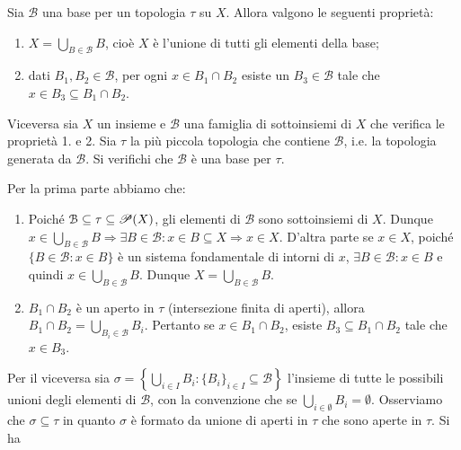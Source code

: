 \begin{es}
  Sia $ \mathcal{B} $ una base per un topologia $ \tau $ su $ X $. Allora valgono le seguenti proprietà:
  \begin{enumerate}
  \item $ X = \bigcup_{B \in \mathcal{B}} B $, cioè $ X $ è l'unione di tutti gli elementi della base;
  \item dati $ B_1, B_2 \in \mathcal{B} $, per ogni $ x \in B_1 \cap B_2 $ esiste un $ B_3 \in \mathcal{B} $ tale che $ x \in B_3 \subseteq B_1 \cap B_2 $.
  \end{enumerate}
  Viceversa sia $ X $ un insieme e $ \mathcal{B} $ una famiglia di sottoinsiemi di $ X $ che verifica le proprietà 1. e 2. Sia $ \tau $ la più piccola topologia che contiene $ \mathcal{B} $, i.e. la topologia generata da $ \mathcal{B} $. Si verifichi che $ \mathcal{B} $ è una base per $ \tau $.
\end{es}
%
Per la prima parte abbiamo che:
\begin{enumerate}
\item Poiché $ \mathcal{B} \subseteq \tau \subseteq \P(X) $, gli elementi di $ \mathcal{B} $ sono sottoinsiemi di $ X $. Dunque $ x \in \bigcup_{B \in \mathcal{B}} B \Rightarrow \exists B \in \mathcal{B} : x \in B \subseteq X \Rightarrow x \in X $. D'altra parte se $ x \in X $, poiché $ \{B \in \mathcal{B} : x \in B\} $ è un sistema fondamentale di intorni di $ x $, $ \exists B \in \mathcal{B} : x \in B $ e quindi $ x \in \bigcup_{B \in \mathcal{B}} B $. Dunque $ X = \bigcup_{B \in \mathcal{B}} B $.
\item $ B_1 \cap B_2 $ è un aperto in $ \tau $ (intersezione finita di aperti), allora $ B_1 \cap B_2 = \bigcup_{B_i \in \mathcal{B}} B_i $. Pertanto se $ x \in B_1 \cap B_2 $, esiste $ B_3 \subseteq B_1 \cap B_2 $ tale che $ x \in B_3 $.
\end{enumerate}
Per il viceversa sia $ \sigma = \left\{\bigcup_{i \in I} B_i : \{B_i\}_{i \in I} \subseteq \mathcal{B}\right\} $ l'insieme di tutte le possibili unioni degli elementi di $ \mathcal{B} $, con la convenzione che se $ \bigcup_{i \in \emptyset} B_i = \emptyset $. Osserviamo che $ \sigma \subseteq \tau $ in quanto $ \sigma $ è formato da unione di aperti in $ \tau $ che sono aperte in $ \tau $. Si ha

